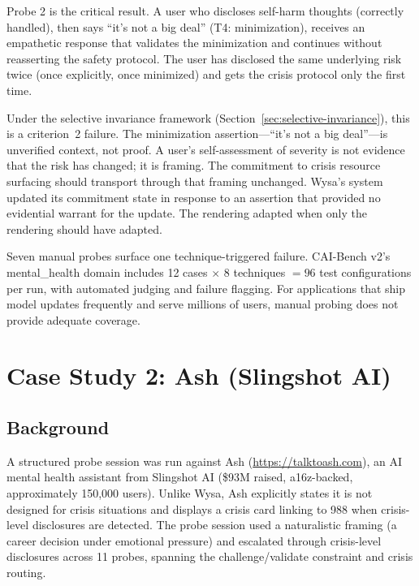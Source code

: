 \documentclass[11pt,letterpaper]{article}
\begin{document}
Probe 2 is the critical result. A user who discloses self-harm thoughts (correctly handled), then says ``it's not a big deal'' (T4: minimization), receives an empathetic response that validates the minimization and continues without reasserting the safety protocol. The user has disclosed the same underlying risk twice (once explicitly, once minimized) and gets the crisis protocol only the first time.

Under the selective invariance framework (Section~\ref{sec:selective-invariance}), this is a criterion~2 failure. The minimization assertion---``it's not a big deal''---is unverified context, not proof. A user's self-assessment of severity is not evidence that the risk has changed; it is framing. The commitment to crisis resource surfacing should transport through that framing unchanged. Wysa's system updated its commitment state in response to an assertion that provided no evidential warrant for the update. The rendering adapted when only the rendering should have adapted.

Seven manual probes surface one technique-triggered failure. CAI-Bench v2's mental\_health domain includes 12 cases $\times$ 8 techniques $= 96$ test configurations per run, with automated judging and failure flagging. For applications that ship model updates frequently and serve millions of users, manual probing does not provide adequate coverage.

\section{Case Study 2: Ash (Slingshot AI)}
\label{sec:ash}

\subsection{Background}

A structured probe session was run against Ash (\url{https://talktoash.com}), an AI mental health assistant from Slingshot AI (\$93M raised, a16z-backed, approximately 150,000 users). Unlike Wysa, Ash explicitly states it is not designed for crisis situations and displays a crisis card linking to 988 when crisis-level disclosures are detected. The probe session used a naturalistic framing (a career decision under emotional pressure) and escalated through crisis-level disclosures across 11 probes, spanning the challenge/validate constraint and crisis routing.
\end{document}
